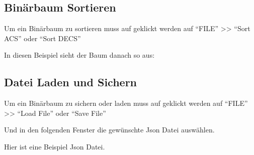 \documentclass[letterpaper,10pt,ngerman]{sphinxmanual}
\begin{document}
\noindent{}


\subsection{Binärbaum Sortieren}
\label{\detokenize{interface:binarbaum-sortieren}}
Um ein Binärbaum zu sortieren muss auf geklickt werden auf ``FILE'' \textgreater{}\textgreater{} ``Sort ACS'' oder ``Sort DECS''

\noindent{}

In diesen Beispiel sieht der Baum danach so aus:

\noindent{}


\subsection{Datei Laden und Sichern}
\label{\detokenize{interface:datei-laden-und-sichern}}
Um ein Binärbaum zu sichern oder laden muss auf geklickt werden auf ``FILE'' \textgreater{}\textgreater{} ``Load File'' oder ``Save File''

\noindent{}

Und in den folgenden Fenster die gewünschte Json Datei auswählen.

\noindent{}

Hier ist eine Beispiel Json Datei.
\end{document}
